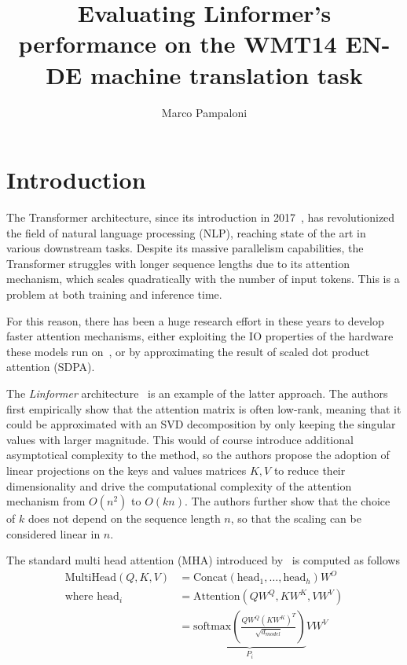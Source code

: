 \documentclass[titlepage]{article}
\title{Evaluating Linformer's performance on the WMT14 EN-DE machine
translation task}
\author{Marco Pampaloni}
\affil{Department of Computer Science}
\begin{document}
\maketitle
\tableofcontents
\newpage

\section{Introduction}

The Transformer architecture, since its introduction in
2017~\cite{vaswani2017}, has revolutionized the field of natural language
processing (NLP), reaching state of the art in various downstream tasks.
Despite its massive parallelism capabilities, the Transformer struggles with
longer sequence lengths due to its attention mechanism, which scales
quadratically with the number of input tokens. This is a problem at both
training and inference time.

For this reason, there has been a huge research effort in these years to
develop faster attention mechanisms, either exploiting the IO properties of the
hardware these models run on~\cite{flashAttention2022}, or by approximating the
result of scaled dot product attention (SDPA).

The \emph{Linformer} architecture~\cite{linformer2020} is an example of the
latter approach. The authors first empirically show that the attention matrix
is often low-rank, meaning that it could be approximated with an SVD
decomposition by only keeping the singular values with larger magnitude. This
would of course introduce additional asymptotical complexity to the method, so
the authors propose the adoption of linear projections on the keys and values
matrices $K, V$ to reduce their dimensionality and drive the computational
complexity of the attention mechanism from $O(n^2)$ to $O(k n)$.
The authors further show that the choice of $k$ does not depend on the sequence
length $n$, so that the scaling can be considered linear in $n$.

The standard multi head attention (MHA) introduced by~\cite{vaswani2017} is computed as
follows
\begin{equation}
  \begin{aligned}
    \textrm{MultiHead}(Q, K, V) &= \textrm{Concat}(\textrm{head}_1, \dots, \textrm{head}_h) W^O \\
    \textrm{where } \textrm{head}_i &= \textrm{Attention}(Q W^Q, K W^K, V W^V) \\
    &= \underbrace{\textrm{softmax}\left(\frac{Q W^Q (K
          W^K)^T}{\sqrt{d_{model}}}\right)}_{P_i} V W^V \\
  \end{aligned}
\end{equation}
\end{document}
